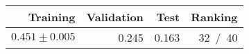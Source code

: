 \begin{tabular}{r|r|r|r}
Training          & Validation & Test & Ranking   \\ \hline
$0.451 \pm 0.005$ & 0.245      & 0.163  & 32~/~40 \\ \hline
\end{tabular}
